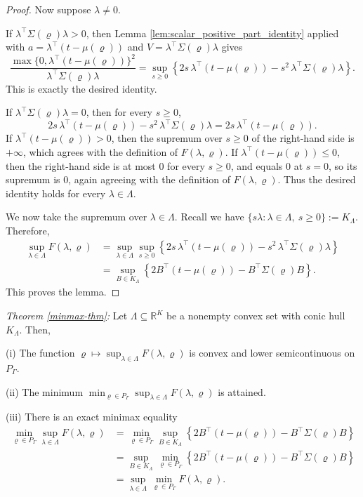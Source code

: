 \documentclass[12pt,leqno,titlepage]{amsart}
\newcommand{\1}{\mathbbm{1}}
\begin{document}
\begin{bibunit}
\begin{proof}
Now suppose $\lambda\neq 0$.

If $\lambda^\top\Sigma(\varrho)\lambda>0$, then Lemma
\ref{lem:scalar_positive_part_identity} applied with
$a=\lambda^\top(t-\mu(\varrho))$ and $V=\lambda^\top\Sigma(\varrho)\lambda$
gives
\[
\frac{\max\{0,\lambda^\top(t-\mu(\varrho))\}^2}
{\lambda^\top\Sigma(\varrho)\lambda}
=
\sup_{s\ge 0}
\left\{
2s\,\lambda^\top(t-\mu(\varrho))
-
s^2\,\lambda^\top\Sigma(\varrho)\lambda
\right\}.
\]
This is exactly the desired identity.

If $\lambda^\top\Sigma(\varrho)\lambda=0$, then for every $s\ge 0$,
\[
2s\,\lambda^\top(t-\mu(\varrho))
-
s^2\,\lambda^\top\Sigma(\varrho)\lambda
=
2s\,\lambda^\top(t-\mu(\varrho)).
\]
If $\lambda^\top(t-\mu(\varrho))>0$, then the supremum over $s\ge 0$ of the
right-hand side is $+\infty$, which agrees with the definition of
$F(\lambda,\varrho)$. If $\lambda^\top(t-\mu(\varrho))\le 0$, then the right-hand
side is at most $0$ for every $s\ge 0$, and equals $0$ at $s=0$, so its
supremum is $0$, again agreeing with the definition of $F(\lambda,\varrho)$.
Thus the desired identity holds for every $\lambda\in\Lambda$.

We now take the supremum over $\lambda\in\Lambda$. Recall we have 
$
\{s\lambda : \lambda\in\Lambda,\ s\ge 0\} := K_\Lambda.$ Therefore,
\begin{align*}
\sup_{\lambda\in\Lambda}F(\lambda,\varrho)
&=
\sup_{\lambda\in\Lambda}\sup_{s\ge 0}
\left\{
2s\,\lambda^\top(t-\mu(\varrho))
-
s^2\,\lambda^\top\Sigma(\varrho)\lambda
\right\}\\
&=
\sup_{B\in K_\Lambda}
\left\{
2B^\top(t-\mu(\varrho))-B^\top\Sigma(\varrho)B
\right\}.
\end{align*}
This proves the lemma.
\end{proof}

\noindent \textit{Theorem \ref{minmax-thm}:} Let $\Lambda \subseteq \mathbb R^K$ be a nonempty convex set with conic hull
$K_\Lambda$. Then, %

\noindent\textup{(i)} The function
$
\varrho\longmapsto \sup_{\lambda\in\Lambda}F(\lambda,\varrho)
$
is convex and lower semicontinuous on $P_\Gamma$.

\noindent\textup{(ii)} The minimum
$
\min_{\varrho\in P_\Gamma}\sup_{\lambda\in\Lambda}F(\lambda,\varrho)
$
is attained.

\noindent\textup{(iii)} There is an exact minimax equality
\begin{align*}
\min_{\varrho\in P_\Gamma}\sup_{\lambda\in\Lambda}F(\lambda,\varrho)
&=
\min_{\varrho\in P_\Gamma}\sup_{B\in K_\Lambda}
\left\{
2B^\top(t-\mu(\varrho))-B^\top\Sigma(\varrho)B
\right\}\\
&=
\sup_{B\in K_\Lambda}\min_{\varrho\in P_\Gamma}
\left\{
2B^\top(t-\mu(\varrho))-B^\top\Sigma(\varrho)B
\right\}\\
&= 
\sup_{\lambda\in\Lambda}
\min_{\varrho\in P_\Gamma}
F(\lambda,\varrho).
\end{align*}


\end{bibunit}
\end{document}
